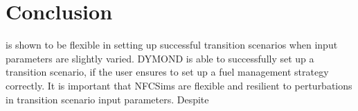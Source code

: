 \chapter{Conclusion}


\Cyclus is shown to be flexible in setting up successful transition 
scenarios when input parameters are slightly varied.
DYMOND is able to successfully set up a transition scenario, if the 
user ensures to set up a fuel management strategy correctly. 
It is important that \glspl{NFCSim} are flexible and resilient to 
perturbations in transition scenario input parameters. 
Despite 

